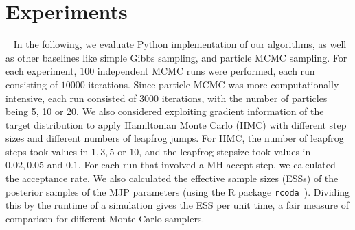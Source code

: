 
\section{Experiments}~
In the following, we evaluate Python implementation of our algorithms, as well as other baselines like simple Gibbs sampling, 
and particle MCMC sampling. For each experiment, $100$ independent MCMC runs were performed, each run consisting of $10000$ iterations.
Since particle MCMC was more computationally intensive, each run consisted of $3000$ iterations, with the number of particles being 5, 10 or 20. 
We also considered exploiting gradient information of the target distribution to apply Hamiltonian Monte Carlo (HMC) with different step sizes and different 
numbers of leapfrog jumps. For HMC, the number of leapfrog steps took values in $1, 3, 5$ or $10$, and the leapfrog stepsize took values in $0.02, 0.05$ and $0.1$. 
For each run that involved a MH accept step, we calculated the acceptance rate.
We also calculated the effective sample sizes (ESSs) of the posterior samples of the MJP parameters (using the R package \texttt{rcoda}~\cite{Rcoda2006}).
Dividing this by the runtime of a simulation gives the ESS per unit time, a fair measure of comparison for different Monte Carlo samplers.



